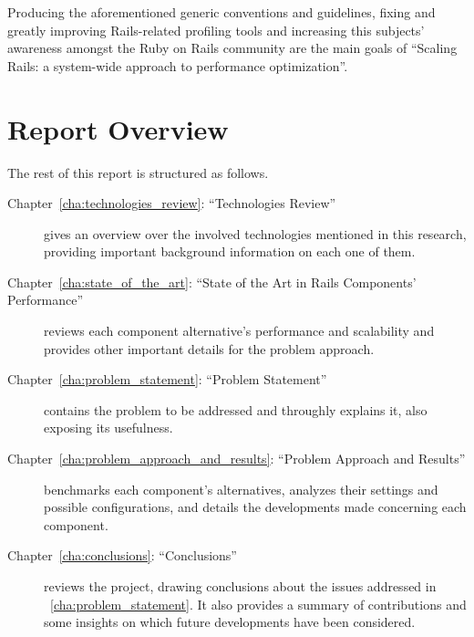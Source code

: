Producing the aforementioned generic conventions and guidelines, fixing and greatly improving Rails-related profiling tools and increasing this subjects' awareness amongst the Ruby on Rails community are the main goals of ``Scaling Rails: a system-wide approach to performance optimization''.

\section{Report Overview} %
\label{sec:report_overview}
The rest of this report is structured as follows.
\begin{description}
  \item[Chapter~\ref{cha:technologies_review}: ``Technologies Review''] gives an overview over the involved technologies mentioned in this research, providing important background information on each one of them.
  \item[Chapter~\ref{cha:state_of_the_art}: ``State of the Art in Rails Components' Performance''] reviews each component alternative's performance and scalability and provides other important details for the problem approach.
  \item[Chapter~\ref{cha:problem_statement}: ``Problem Statement''] contains the problem to be addressed and throughly explains it, also exposing its usefulness.
  \item[Chapter~\ref{cha:problem_approach_and_results}: ``Problem Approach and Results''] benchmarks each component's alternatives, analyzes their settings and possible configurations, and details the developments made concerning each component.
  \item[Chapter~\ref{cha:conclusions}: ``Conclusions''] reviews the project, drawing conclusions about the issues addressed in ~\ref{cha:problem_statement}. It also provides a summary of contributions and some insights on which future developments have been considered.
\end{description}

